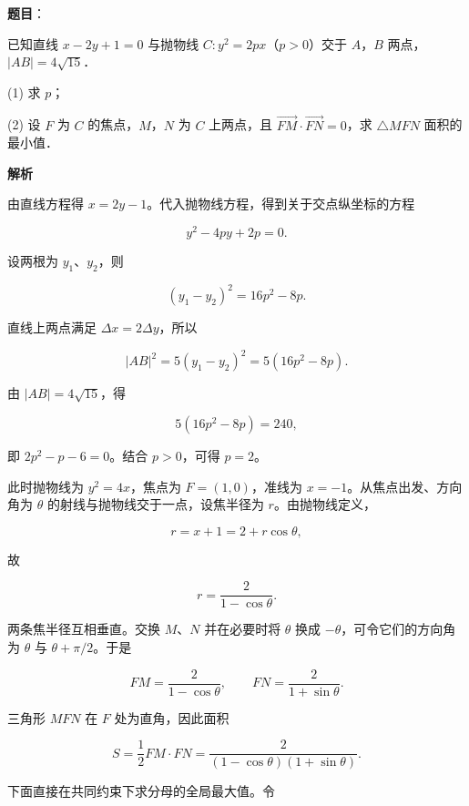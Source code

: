 \begin{answer}

\textbf{题目}：

已知直线 $x-2y+1=0$ 与抛物线 $C:y^2=2px$（$p>0$）交于 $A$，$B$ 两点，$|AB|=4\sqrt{15}$．

  (1) 求 $p$；

  (2) 设 $F$ 为 $C$ 的焦点，$M$，$N$ 为 $C$ 上两点，且 $\overrightarrow{FM}\cdot\overrightarrow{FN}=0$，求 $\triangle MFN$ 面积的最小值．

\textbf{解析}


由直线方程得 $x=2y-1$。代入抛物线方程，得到关于交点纵坐标的方程

\nopagebreak[4]
\[
y^2-4py+2p=0.
\]

设两根为 $y_1$、$y_2$，则

\nopagebreak[4]
\[
(y_1-y_2)^2=16p^2-8p.
\]

直线上两点满足 $\Delta x=2\Delta y$，所以

\nopagebreak[4]
\[
|AB|^2=5(y_1-y_2)^2=5(16p^2-8p).
\]

由 $|AB|=4\sqrt{15}$，得

\nopagebreak[4]
\[
5(16p^2-8p)=240,
\]

即 $2p^2-p-6=0$。结合 $p>0$，可得 $p=2$。


此时抛物线为 $y^2=4x$，焦点为 $F=(1,0)$，准线为 $x=-1$。从焦点出发、方向角为 $\theta$ 的射线与抛物线交于一点，设焦半径为 $r$。由抛物线定义，

\nopagebreak[4]
\[
r=x+1=2+r\cos\theta,
\]

故

\nopagebreak[4]
\[
r=\frac2{1-\cos\theta}.
\]

两条焦半径互相垂直。交换 $M$、$N$ 并在必要时将 $\theta$ 换成 $-\theta$，可令它们的方向角为 $\theta$ 与 $\theta+\pi/2$。于是

\nopagebreak[4]
\[
FM=\frac2{1-\cos\theta},\qquad
FN=\frac2{1+\sin\theta}.
\]

三角形 $MFN$ 在 $F$ 处为直角，因此面积

\nopagebreak[4]
\[
S=\frac12FM\cdot FN
=\frac2{(1-\cos\theta)(1+\sin\theta)}.
\]

下面直接在共同约束下求分母的全局最大值。令


\end{answer}
